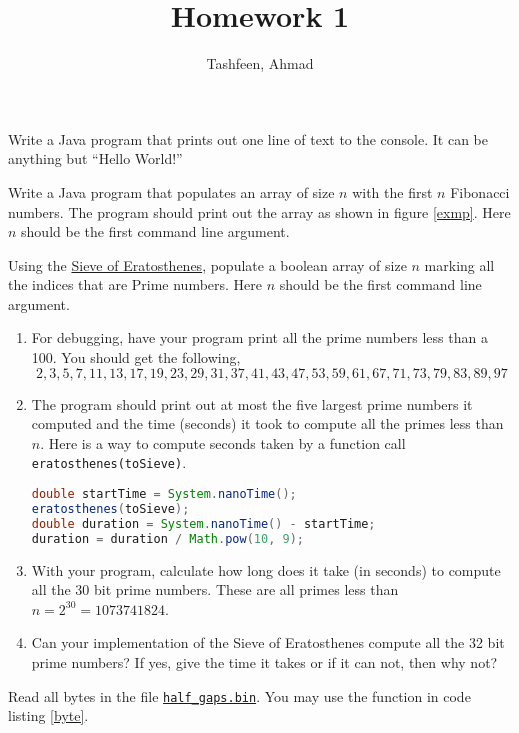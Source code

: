 \documentclass{homework}
\author{Tashfeen, Ahmad}
\title{Homework 1}
\begin{document}
 \maketitle

\question Write a Java program that prints out one line of text to the
console. It can be anything but ``Hello World!''

\question Write a Java program that populates an array of size $n$
with the first $n$ Fibonacci numbers. The program should print out the
array as shown in figure \ref{exmp}. Here $n$ should be the first command line
argument.

\question Using the
\href{https://en.wikipedia.org/wiki/Sieve_of_Eratosthenes}{Sieve of
  Eratosthenes}, populate a boolean array of size $n$ marking all the
indices that are Prime numbers. Here $n$ should be the first command
line argument.

\begin{enumerate}
  \item For debugging, have your program print all the prime numbers
        less than a 100. You should get the following,
        \[
          2, 3, 5, 7, 11, 13, 17, 19, 23, 29, 31, 37, 41, 43, 47,
          53, 59, 61, 67, 71, 73, 79, 83, 89, 97
        \]
  \item The program should print out at most the five largest
        prime numbers it computed and the time (seconds) it took to
        compute all the primes less than $n$. Here is a way to compute
        seconds taken by a function call
        \texttt{eratosthenes(toSieve)}.

        \begin{lstlisting}[language=java]
double startTime = System.nanoTime();
eratosthenes(toSieve);
double duration = System.nanoTime() - startTime;
duration = duration / Math.pow(10, 9);
\end{lstlisting}

  \item With your program, calculate how long does it take (in seconds)
        to compute all the 30 bit prime numbers. These are all primes less
        than $n = 2^{30} = 1073741824$.

  \item Can your implementation of the Sieve of Eratosthenes
        compute all the 32 bit prime numbers? If yes, give the time it
        takes or if it can not, then why not?
\end{enumerate}

\question Read all bytes in the file \href{https://tinyurl.com/24bvsnaf}{\texttt{half\_gaps.bin}}. You may
use the function in code listing \ref{byte}.
\end{document}

